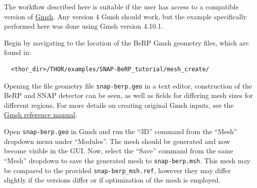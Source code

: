 The workflow described here is suitable if the user has access to a compatible version of \href{https://gmsh.info/}{Gmsh}.
Any version 4 Gmsh should work, but the example specifically performed here was done using Gmsh version 4.10.1.

Begin by navigating to the location of the BeRP Gmsh geometry files, which are found in:
\begin{verbatim}
  <thor_dir>/THOR/examples/SNAP-BeRP_tutorial/mesh_create/
\end{verbatim}
Opening the file geometry file \verb"snap-berp.geo" in a text editor, construction of the BeRP and SNAP detector can be seen, as well as fields for differing mesh sizes for different regions.
For more details on creating original Gmsh inputs, see the \href{https://gmsh.info/doc/texinfo/gmsh.html}{Gmsh reference manual}.

Open \verb"snap-berp.geo" in Gmsh and run the ``3D'' command from the ``Mesh'' dropdown menu under ``Modules''.
The mesh should be generated and now become visible in the \ac{GUI}.
Now, select the ``Save'' command from the same ``Mesh'' dropdown to save the generated mesh to \verb"snap-berp.msh".
This mesh may be compared to the provided \verb"snap-berp_msh.ref", however they may differ slightly if the versions differ or if optimization of the mesh is employed.

